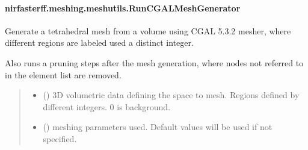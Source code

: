 \documentclass[letterpaper,10pt,english]{sphinxmanual}
\begin{document}
\sphinxstepscope


\paragraph{nirfasterff.meshing.meshutils.RunCGALMeshGenerator}
\label{\detokenize{_autosummary/nirfasterff.meshing.meshutils.RunCGALMeshGenerator:nirfasterff-meshing-meshutils-runcgalmeshgenerator}}\label{\detokenize{_autosummary/nirfasterff.meshing.meshutils.RunCGALMeshGenerator::doc}}

\begin{fulllineitems}
\label{\detokenize{_autosummary/nirfasterff.meshing.meshutils.RunCGALMeshGenerator:nirfasterff.meshing.meshutils.RunCGALMeshGenerator}}
\pysigstartsignatures
{}
\pysigstopsignatures
\sphinxAtStartPar
Generate a tetrahedral mesh from a volume using CGAL 5.3.2 mesher, where different regions are labeled used a distinct integer.

\sphinxAtStartPar
Also runs a pruning steps after the mesh generation, where nodes not referred to in the element list are removed.
\begin{quote}\begin{description}
\begin{itemize}
\item {} 
\sphinxAtStartPar
{} () \textendash{} 3D volumetric data defining the space to mesh. Regions defined by different integers. 0 is background.

\item {} 
\sphinxAtStartPar
{} ({\hyperref[\detokenize{_autosummary/nirfasterff.utils.MeshingParams:nirfasterff.utils.MeshingParams}]{}}\sphinxstyleliteralemphasis{\sphinxupquote{, }}) \textendash{} 
\sphinxAtStartPar
meshing parameters used. Default values will be used if not specified.


\end{itemize}
\end{description}
\end{quote}
\end{fulllineitems}
\end{document}
